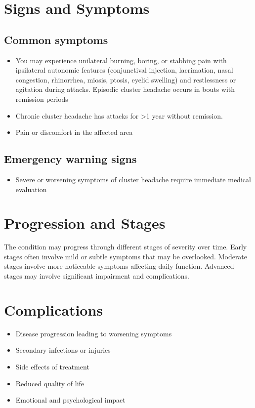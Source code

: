 \section{Signs and Symptoms}
\subsection{Common symptoms}
\begin{itemize}[noitemsep]
  \item You may experience unilateral burning, boring, or stabbing pain with ipsilateral autonomic features (conjunctival injection, lacrimation, nasal congestion, rhinorrhea, miosis, ptosis, eyelid swelling) and restlessness or agitation during attacks. Episodic cluster headache occurs in bouts with remission periods
  \item Chronic cluster headache has attacks for >1 year without remission.
  \item Pain or discomfort in the affected area
  \end{itemize}
\subsection{Emergency warning signs}
\begin{itemize}[noitemsep]
  \item Severe or worsening symptoms of cluster headache require immediate medical evaluation
\end{itemize}
\section{Progression and Stages}
The condition may progress through different stages of severity over time. Early stages often involve mild or subtle symptoms that may be overlooked. Moderate stages involve more noticeable symptoms affecting daily function. Advanced stages may involve significant impairment and complications.
\section{Complications}
\begin{itemize}[noitemsep]
  \item Disease progression leading to worsening symptoms
  \item Secondary infections or injuries
  \item Side effects of treatment
  \item Reduced quality of life
  \item Emotional and psychological impact
\end{itemize}
